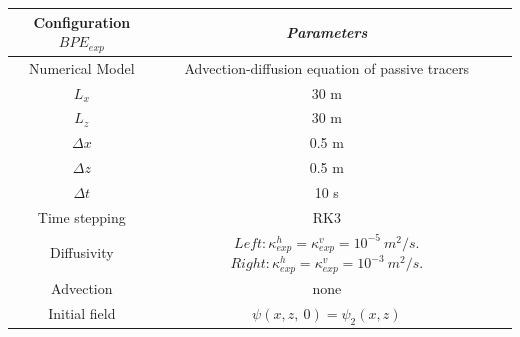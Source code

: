 \begin{table}[h]
        \centering
        \begin{tabular}{|c|c|c|}
                \hline
                Configuration $BPE_{exp}$ & \textit{Parameters}\\
                \hline 
                Numerical Model & Advection-diffusion equation of passive tracers\\
                $L_x$ & 30 m\\
                $L_z$ & 30 m\\
                $\Delta x$ & 0.5 m\\
                $\Delta z$ & 0.5 m\\
                $\Delta t$ & 10 s\\
                Time stepping & RK3 \\
                Diffusivity & $Left: \kappa_{exp}^h=\kappa_{exp}^v=10^{-5}\ m^2/s$. $Right: \kappa_{exp}^h=\kappa_{exp}^v=10^{-3}\ m^2/s$. \\
                Advection & none\\
                Initial field & $\psi(x, z,\ 0)=\psi_2(x,z)$\\
                \hline
        \end{tabular}
        \label{tab_NUMLAB_exp}
\end{table}
